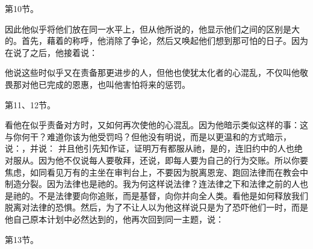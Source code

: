 第10节。\par

因此他似乎将他们放在同一水平上，但从他所说的，他显示他们之间的区别是大的。首先，藉着的称呼，他消除了争论，然后又唤起他们想到那可怕的日子。因为在说了之后，他接着说：\par

他说这些时似乎又在责备那更进步的人，但他也使犹太化者的心混乱，不仅叫他敬畏那对他已完成的恩惠，也叫他害怕将来的惩罚。\par

第11、12节。\par

看他在似乎责备对方时，又如何再次使他的心混乱。因为他暗示类似这样的事：这与你何干？难道你该为他受罚吗？但他没有明说，而是以更温和的方式暗示，说：，并说： 并且他引先知作证，证明万有都服从祂，是的，连旧约中的人也绝对服从。因为他不仅说每人要敬拜，还说，即每人要为自己的行为交账。所以你要焦虑，如同看见万有的主坐在审判台上，不要因为脱离恩宠、跑回法律而在教会中制造分裂。因为法律也是祂的。我为何这样说法律？连法律之下和法律之前的人也是祂的。不是法律要向你追账，而是基督，向你并向全人类。看他是如何释放我们脱离对法律的恐惧。然后，为了不让人以为他这样说只是为了恐吓他们一时，而是他自己原本计划中必然达到的，他再次回到同一主题，说：\par

第13节。\par

